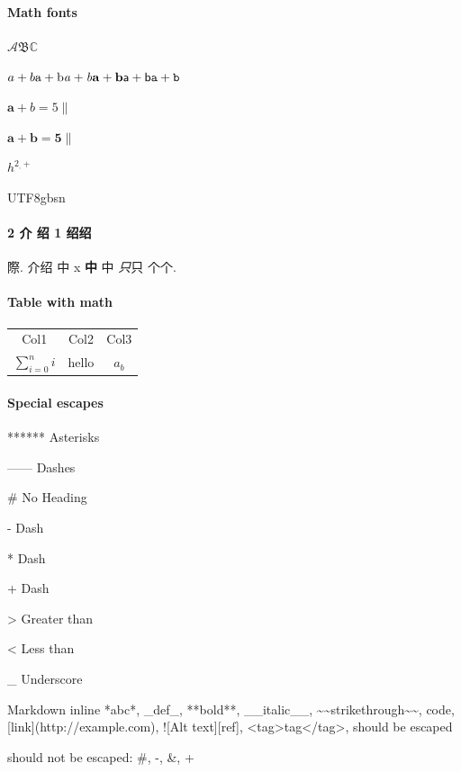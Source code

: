 \documentclass{article}
\begin{document}
\paragraph{Math fonts}

$ \mathcal{A} \mathfrak{B} \mathbb{C} $

$ \mathnormal{a+b} \mathrm{a+b} \mathit{a+b} \mathbf{a+b} \mathsf{a+b} \mathtt{a+b} $

$ {\bm a + b = 5 \|} $

$ \boldsymbol{a + b = 5 \|} $

$h^{2_,+}$

\begin{CJK}{UTF8}{gbsn}

\paragraph{2 介 绍 1 绍绍}

際. 介绍 中 x \textbf{中} 中 \textit{只}只 \textrm{个}个.

\end{CJK}

\paragraph{Table with math}

\begin{tabular}{ccc}
    \toprule
    Col1 & Col2 & Col3 \\
    $\sum_{i=0}^n i$ & hello & $a_b$ \\
    \bottomrule
\end{tabular}

\paragraph{Special escapes}

****** Asterisks

------ Dashes

 \# No Heading

 - Dash

 * Dash

 + Dash

 > Greater than

 < Less than

 \_ Underscore

Markdown inline
*abc*,
\_def\_,
**bold**,
\_\_italic\_\_,
\textasciitilde\textasciitilde strikethrough\textasciitilde\textasciitilde,
\textasciigrave code\textasciigrave,
[link](http://example.com),
![Alt text][ref],
<tag>tag</tag>,
should be escaped

should not be escaped: \#, -, \&, +
\end{document}
